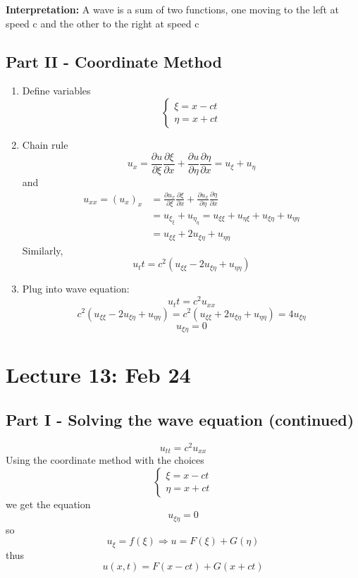 \documentclass[12pt]{article}
\begin{document}
\textbf{Interpretation:} A wave is a sum of two functions, one moving to the left at speed c and the other to the right at speed c 

\subsection*{Part II - Coordinate Method}
\begin{enumerate}
    \item Define variables 
    \[\begin{cases}
        \xi  =x - ct \\
        \eta = x + ct
    \end{cases}\]
    \item Chain rule 
    \[u_x = \frac{\partial u}{\partial \xi} \frac{\partial \xi}{\partial x} + \frac{\partial u}{\partial \eta} \frac{\partial \eta}{\partial x} = u_\xi + u_\eta\]
    and 
    \begin{align*}
        u_{xx} = (u_x)_x &= \frac{\partial u_x}{\partial \xi} \frac{\partial \xi}{\partial x} + \frac{\partial u_x}{\partial \eta} \frac{\partial \eta}{\partial x} \\
        &= u_{\xi_\xi} + u_{\eta_\eta} = u_{\xi \xi} + u_{\eta \xi} + u_{\xi \eta} + u_{\eta \eta}\\
        &= u_{\xi \xi} + 2u_{\xi \eta} + u_{\eta \eta}
    \end{align*}
    Similarly, 
    \[u_tt = c^2 (u_{\xi \xi} - 2u_{\xi \eta} + u_{\eta \eta})\]

    \item Plug into wave equation:
    \[u_tt = c^2 u_{xx}\]
    \[c^2 (u_{\xi \xi} - 2u_{\xi \eta} + u_{\eta \eta}) = c^2( u_{\xi \xi} + 2u_{\xi \eta} + u_{\eta \eta}) = 4u_{\xi \eta}\]
    \[\boxed{u_{\xi \eta} = 0}\]
\end{enumerate}

\section{Lecture 13: Feb 24}
\subsection*{Part I - Solving the wave equation (continued)}
\[u_{tt} = c^2 u_{xx}\]
Using the coordinate method with the choices 
\[\begin{cases}
    \xi = x - ct\\
    \eta = x + ct
\end{cases}\]
we get the equation 
\[u_{\xi \eta} = 0\]
so
\[u_\xi = f(\xi) \Longrightarrow u = F(\xi) + G(\eta)\]
thus 
\[\boxed{u(x, t) = F(x - ct) + G(x + ct)}\]
\end{document}
